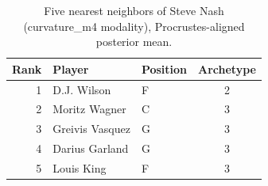 \begin{table}[htbp]
  \centering\small
  \begin{tabular}{rllc}
    \toprule
    Rank & Player & Position & Archetype \\
    \midrule
    1 & D.J. Wilson & F & 2 \\
    2 & Moritz Wagner & C & 3 \\
    3 & Greivis Vasquez & G & 3 \\
    4 & Darius Garland & G & 3 \\
    5 & Louis King & F & 3 \\
    \bottomrule
  \end{tabular}
  \caption{Five nearest neighbors of Steve Nash (curvature_m4 modality), Procrustes-aligned posterior mean.}
  \label{tab:Steve_Nash_neighbors_curvature_m4}
\end{table}

